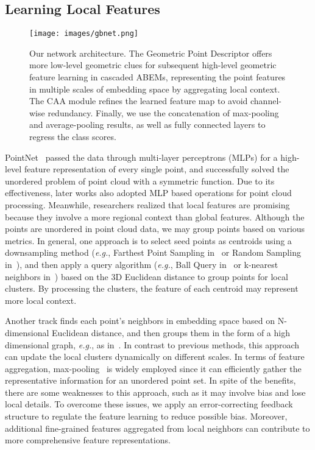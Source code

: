 \documentclass[journal,twoside]{IEEEtran}
\newcommand{\latinphrase}[1]{\textit{#1}}
\newcommand{\eg}{\latinphrase{e.g.}\xspace}
\begin{document}
\subsection{Learning Local Features}
\begin{figure*}
\begin{center}
\texttt{[image: images/gbnet.png]}
\end{center}
   \caption{Our network architecture. The Geometric Point Descriptor offers more low-level geometric clues for subsequent high-level geometric feature learning in cascaded ABEMs, representing the point features in multiple scales of embedding space by aggregating local context. The CAA module refines the learned feature map to avoid channel-wise redundancy. Finally, we use the concatenation of max-pooling and average-pooling results, as well as fully connected layers to regress the class scores.}
\label{fig:network}
\end{figure*}

PointNet~\cite{qi2017pointnet} passed the data through multi-layer perceptrons (MLPs) for a high-level feature representation of every single point, and successfully solved the unordered problem of point cloud with a symmetric function. Due to its effectiveness, later works \cite{qi2017pointnet++,li2018pointcnn,wang2019dynamic,liu2019relation} also adopted MLP based operations for point cloud processing. Meanwhile, researchers realized that local features are promising because they involve a more regional context than global features. Although the points are unordered in point cloud data, we may group points based on various metrics. In general, one approach is to select seed points as centroids using a downsampling method (\eg, Farthest Point Sampling in~\cite{qi2017pointnet++, liu2019relation, Yan_2020_CVPR} or Random Sampling in~\cite{Hu_2020_CVPR}), and then apply a query algorithm (\eg, Ball Query in~\cite{qi2017pointnet++} or k-nearest neighbors in~\cite{Hu_2020_CVPR}) based on the 3D Euclidean distance to group points for local clusters. By processing the clusters, the feature of each centroid may represent more local context. 

Another track finds each point's neighbors in embedding space based on N-dimensional Euclidean distance, and then groups them in the form of a high dimensional graph, \eg, as in~\cite{wang2019dynamic, engelmann2019dilated}. In contrast to previous methods, this approach can update the local clusters dynamically on different scales. In terms of feature aggregation, max-pooling~\cite{qi2017pointnet} is widely employed since it can efficiently gather the representative information for an unordered point set. In spite of the benefits, there are some weaknesses to this approach, such as it may involve bias and lose local details. To overcome these issues, we apply an error-correcting feedback structure to regulate the feature learning to reduce possible bias. Moreover, additional fine-grained features aggregated from local neighbors can contribute to more comprehensive feature representations.
\end{document}
